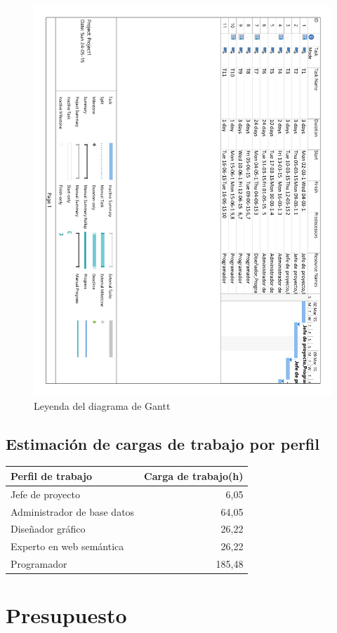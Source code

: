\begin{figure}[!htp]
	\centering
	\includegraphics[page=4, scale=.7]{fig/gantt_diagram}
	\caption{Leyenda del diagrama de Gantt}
\end{figure}


\section{Estimación de cargas de trabajo por perfil}

\begin{center}
	\begin{tabular}{|l|r|}
		\hline
		Perfil de trabajo & Carga de trabajo(h) \\ \hline
		Jefe de proyecto & 6,05 \\ \hline
		Administrador de base datos & 64,05 \\ \hline
		Diseñador gráfico & 26,22 \\ \hline
		Experto en web semántica & 26,22 \\ \hline
		Programador & 185,48 \\
		\hline
	\end{tabular}
\end{center}

\chapter{Presupuesto}





\clearpage

